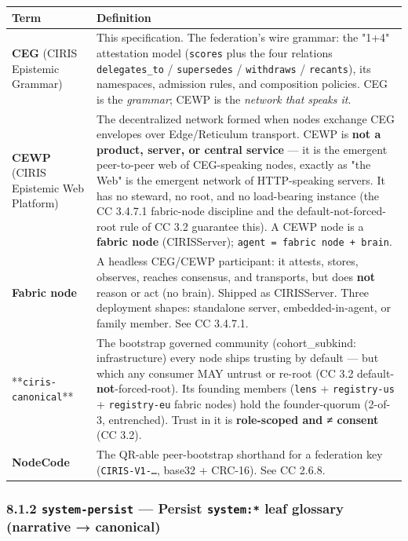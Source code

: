 \documentclass[11pt]{article}
\begin{document}
{\footnotesize
\begin{longtable}{|p{8.0cm}|p{8.0cm}|}\hline
\textbf{Term} & \textbf{Definition} \\ \hline\endhead
\textbf{CEG} (CIRIS Epistemic Grammar) & This specification. The federation's wire grammar: the "1+4" attestation model (\texttt{scores} plus the four relations \texttt{delegates\_to} / \texttt{supersedes} / \texttt{withdraws} / \texttt{recants}), its namespaces, admission rules, and composition policies. CEG is the \textit{grammar}; CEWP is the \textit{network that speaks it}. \\ \hline
\textbf{CEWP} (CIRIS Epistemic Web Platform) & The decentralized network formed when nodes exchange CEG envelopes over Edge/Reticulum transport. CEWP is \textbf{not a product, server, or central service} — it is the emergent peer-to-peer web of CEG-speaking nodes, exactly as "the Web" is the emergent network of HTTP-speaking servers. It has no steward, no root, and no load-bearing instance (the CC 3.4.7.1 fabric-node discipline and the default-not-forced-root rule of CC 3.2 guarantee this). A CEWP node is a \textbf{fabric node} (CIRISServer); \texttt{agent = fabric node + brain}. \\ \hline
\textbf{Fabric node} & A headless CEG/CEWP participant: it attests, stores, observes, reaches consensus, and transports, but does \textbf{not} reason or act (no brain). Shipped as CIRISServer. Three deployment shapes: standalone server, embedded-in-agent, or family member. See CC 3.4.7.1. \\ \hline
**\texttt{ciris-canonical}** & The bootstrap governed community (cohort\_subkind: infrastructure) every node ships trusting by default — but which any consumer MAY untrust or re-root (CC 3.2 default-\textbf{not}-forced-root). Its founding members (\texttt{lens} + \texttt{registry-us} + \texttt{registry-eu} fabric nodes) hold the founder-quorum (2-of-3, entrenched). Trust in it is \textbf{role-scoped and ≠ consent} (CC 3.2). \\ \hline
\textbf{NodeCode} & The QR-able peer-bootstrap shorthand for a federation key (\texttt{CIRIS-V1-…}, base32 + CRC-16). See CC 2.6.8. \\ \hline
\end{longtable}}


\subsubsection*{8.1.2 \texttt{system-persist} — Persist \texttt{system:*} leaf glossary (narrative → canonical)}
\end{document}
